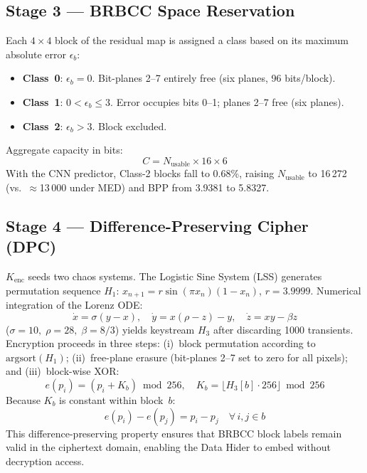 \documentclass[runningheads]{llncs}
\begin{document}
\subsection{Stage 3 — BRBCC Space Reservation}
Each $4\times4$ block of the residual map is assigned a
class based on its maximum absolute error $\epsilon_b$:
\begin{itemize}
\item \textbf{Class~0}: $\epsilon_b=0$. Bit-planes 2--7
      entirely free (six planes, 96 bits/block).
\item \textbf{Class~1}: $0<\epsilon_b\le3$. Error occupies
      bits 0--1; planes 2--7 free (six planes).
\item \textbf{Class~2}: $\epsilon_b>3$. Block excluded.
\end{itemize}
Aggregate capacity in bits:
\begin{equation}
C = N_\text{usable}\times 16 \times 6
\label{eq:brbcc}
\end{equation}
With the CNN predictor, Class-2 blocks fall to 0.68\%,
raising $N_\text{usable}$ to 16\,272 (vs.\ $\approx$13\,000
under MED) and BPP from 3.9381 to 5.8327.

\subsection{Stage 4 — Difference-Preserving Cipher (DPC)}
$K_\text{enc}$ seeds two chaos systems. The Logistic Sine
System (LSS) generates permutation sequence $H_1$:
$x_{n+1}=r\sin(\pi x_n)(1-x_n)$, $r=3.9999$.
Numerical integration of the Lorenz ODE:
\begin{equation}
\dot x=\sigma(y-x),\quad
\dot y=x(\rho-z)-y,\quad
\dot z=xy-\beta z
\label{eq:lorenz}
\end{equation}
($\sigma=10,\;\rho=28,\;\beta=8/3$) yields keystream
$H_3$ after discarding 1000 transients.
Encryption proceeds in three steps: (i)~block permutation
according to $\mathrm{argsort}(H_1)$; (ii)~free-plane erasure
(bit-planes 2--7 set to zero for all pixels); and
(iii)~block-wise XOR:
\begin{equation}
e(p_i) = (p_i + K_b)\bmod 256,\quad
K_b=\lfloor H_3[b]\cdot 256\rfloor\bmod 256
\label{eq:dpc}
\end{equation}
Because $K_b$ is constant within block~$b$:
\begin{equation}
e(p_i)-e(p_j)=p_i-p_j\quad\forall\,i,j\in b
\label{eq:diffpres}
\end{equation}
This difference-preserving property ensures that BRBCC
block labels remain valid in the ciphertext domain, enabling
the Data Hider to embed without decryption access.
\end{document}

